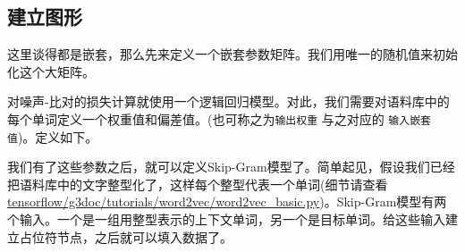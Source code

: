\subsection{建立图形 }\label{ux5efaux7acbux56feux5f62}

这里谈得都是嵌套，那么先来定义一个嵌套参数矩阵。我们用唯一的随机值来初始化这个大矩阵。

\begin{Shaded}
\begin{Highlighting}[]
\OperatorTok{=} 
    \OperatorTok{-}\NormalTok{, }\NormalTok{))}
\end{Highlighting}
\end{Shaded}

对噪声-比对的损失计算就使用一个逻辑回归模型。对此，我们需要对语料库中的每个单词定义一个权重值和偏差值。(也可称之为\texttt{输出权重}
与之对应的 \texttt{输入嵌套值})。定义如下。

\begin{Shaded}
\begin{Highlighting}[]
\OperatorTok{=} 
                      \OperatorTok{=} \OperatorTok{/} 
\OperatorTok{=} 
\end{Highlighting}
\end{Shaded}

我们有了这些参数之后，就可以定义Skip-Gram模型了。简单起见，假设我们已经把语料库中的文字整型化了，这样每个整型代表一个单词(细节请查看
\href{https://tensorflow.googlesource.com/tensorflow/+/master/tensorflow/g3doc/tutorials/word2vec/word2vec_basic.py}{tensorflow/g3doc/tutorials/word2vec/word2vec\_basic.py})。Skip-Gram模型有两个输入。一个是一组用整型表示的上下文单词，另一个是目标单词。给这些输入建立占位符节点，之后就可以填入数据了。

\begin{Shaded}
\begin{Highlighting}[]
\OperatorTok{=} \OperatorTok{=}
\OperatorTok{=} \OperatorTok{=}\NormalTok{[batch_size, }\NormalTok{])}
\end{Highlighting}
\end{Shaded}


